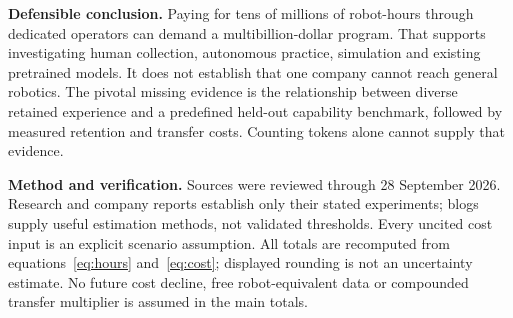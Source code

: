 \documentclass{article}
\begin{document}
\textbf{Defensible conclusion.} Paying for tens of millions of robot-hours
through dedicated operators can demand a multibillion-dollar program.
That supports investigating human collection, autonomous practice,
simulation and existing pretrained models. It does not establish that one
company cannot reach general robotics. The pivotal missing evidence is
the relationship between diverse retained experience and a predefined
held-out capability benchmark, followed by measured retention and transfer
costs. Counting tokens alone cannot supply that evidence.

\printbibliography[title={References}]

\vspace{6pt}
\textbf{Method and verification.}
Sources were reviewed through 28 September 2026. Research and company reports
establish only their stated experiments; blogs supply useful estimation methods,
not validated thresholds. Every uncited cost input is an explicit scenario
assumption. All totals are recomputed from equations~\eqref{eq:hours}
and~\eqref{eq:cost}; displayed rounding is not an uncertainty estimate.
No future cost decline, free robot-equivalent data or compounded transfer
multiplier is assumed in the main totals.
\end{document}
